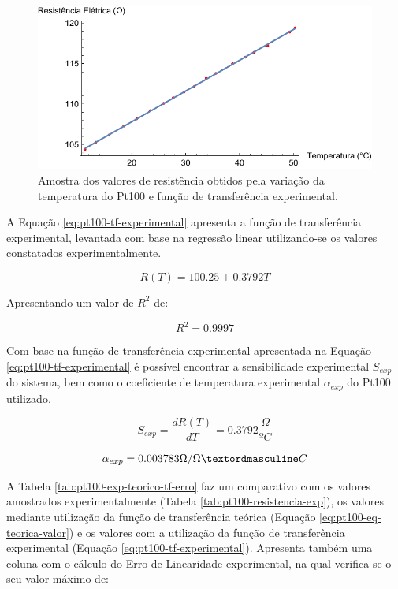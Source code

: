 \documentclass[a4paper]{instrumentacao}
\begin{document}
\begin{figure}[H]
	\centering \includegraphics[width=\textwidth]{Temperatura/ResistenceTransferFunction.pdf}
	\caption{Amostra dos valores de resistência obtidos pela variação da temperatura do Pt100 e função de transferência experimental.}
	\label{fig:pt100-tf-experimental}
\end{figure}

A Equação \ref{eq:pt100-tf-experimental} apresenta a função de transferência experimental, levantada com base na regressão linear utilizando-se os valores constatados experimentalmente.

\begin{equation}
	R(T)=100.25+0.3792T
	\label{eq:pt100-tf-experimental}
\end{equation}

Apresentando um valor de $R^2$ de:

\begin{equation}
	R^2=0.9997
	\label{eq:pt100-r2-tf-experimental}
\end{equation}

Com base na função de transferência experimental apresentada na Equação \ref{eq:pt100-tf-experimental} é possível encontrar a sensibilidade experimental $S_{exp}$ do sistema, bem como o coeficiente de temperatura experimental $\alpha_{exp}$ do Pt100 utilizado.

\begin{equation}
	S_{exp}=\frac{dR(T)}{dT}=0.3792\frac{\Omega}{ºC}
	\label{eq:pt100-sensibilidade-experimental}
\end{equation}

\begin{equation}
	\alpha_{exp}=0.003783\Omega/\OmegaºC
	\label{eq:pt100-alpha-experimental}
\end{equation}

A Tabela \ref{tab:pt100-exp-teorico-tf-erro} faz um comparativo com os valores amostrados experimentalmente (Tabela \ref{tab:pt100-resistencia-exp}), os valores mediante utilização da função de transferência teórica (Equação \ref{eq:pt100-eq-teorica-valor}) e os valores com a utilização da função de transferência experimental (Equação \ref{eq:pt100-tf-experimental}). Apresenta também uma coluna com o cálculo do Erro de Linearidade experimental, na qual verifica-se o seu valor máximo de:
\end{document}
